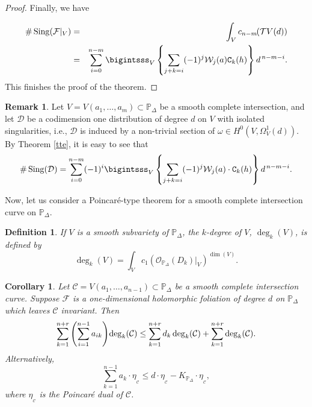 \documentclass[11pt]{amsart}
\theoremstyle{plain}
\newtheorem{defi}{Definition}[section]
\newtheorem{cor}{Corollary}[section]
\theoremstyle{definition}
\newtheorem{obs}{Remark}[section]
\begin{document}
\begin{proof}
\vskip 0.2cm
\noindent Finally, we have

\begin{eqnarray*}
\#\,\mathrm{Sing}(\mathcal{F}|_V)&=&\int_Vc_{n-m}\hspace{-1mm}\left(\mathcal{T}V(d)\right) \\
&=& \sum_{i=0}^{n-m}\displaystyle\bigintsss_V\left\{\sum_{j+k=i}(-1)^{j}\mathcal{W}_j(a)\texttt{C}_{k}(h)\right\}d^{\,n-m-i}.
\end{eqnarray*}
\noindent This finishes the proof of the theorem.
\end{proof}

\begin{obs} Let $V=V(a_1,\ldots,a_m)\subset\mathbb{P}_{\Delta}$ be a smooth complete intersection, and 
let $\mathcal{D}$ be a codimension one distribution of degree $d$ on $V$ with isolated singularities, i.e., 
$\mathcal{D}$ is induced by a non-trivial section of $\omega\in H^{0}(V, \Omega^1_V(d))$. By Theorem \ref{tte}, 
it is easy to see that
$$\#\,\mathrm{Sing}(\mathcal{D})
=\sum_{i=0}^{n-m}(-1)^i\displaystyle\bigintsss_V\left\{\sum_{j+k=i}(-1)^{j}\mathcal{W}_j(a)\cdot\texttt{C}_{k}(h)\right\}d^{\,n-m-i}.$$
\end{obs}

Now, let us consider a Poincar\'e-type theorem for a smooth complete intersection curve on $\mathbb{P}_{\Delta}$.

\begin{defi}\cite{Fu}
If $V$ is a smooth subvariety of $\mathbb{P}_{\Delta}$, the $k$-degree of $V$, $\deg_k(V)$, is defined by 
$$\deg_k(V)=\int_Vc_{1}\left(\mathcal{O}_{\mathbb{P}_{\Delta}}(D_k)|_V\right)^{\dim(V)}.$$
\end{defi}
\vskip 0.1cm

\begin{cor} \label{ccrr}
Let $\mathcal{C}=V(a_1,\ldots,a_{n-1})\subset\mathbb{P}_{\Delta}$ be a smooth complete intersection curve.
Suppose $\mathcal{F}$ is a one-dimensional holomorphic foliation of degree $d$ on $\mathbb{P}_{\Delta}$ 
which leaves $\mathcal{C}$ invariant. Then 
$$\sum_{k=1}^{n+r} \left(\sum_{i=1}^{n-1}a_{ik}\right) \hspace{-0,5mm} \deg_k(\mathcal{C}) \leq \sum_{k=1}^{n+r} d_k \deg_k(\mathcal{C})
+\sum_{k=1}^{n+r} \deg_k(\mathcal{C}).$$
Alternatively,
$$\sum_{k=1}^{n-1} a_k \cdot\eta_{_\mathcal{C}} \leq d\cdot\eta_{_\mathcal{C}}-K_{\mathbb{P}_{\Delta}}\cdot\eta_{_\mathcal{C}},$$
\vskip 0.1cm
\noindent where $\eta_{_\mathcal{C}}$ is the Poincar\'e dual of $\mathcal{C}$.
\end{cor}
\end{document}

